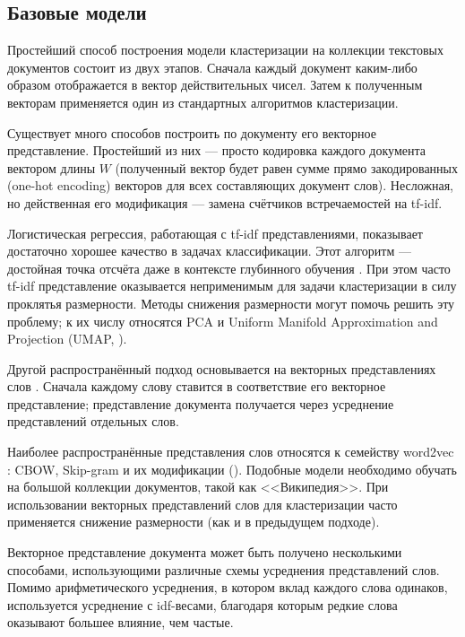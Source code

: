 \subsection{Базовые модели}

\par Простейший способ построения модели кластеризации на коллекции текстовых документов состоит из двух этапов. Сначала каждый документ каким-либо образом отображается в вектор действительных чисел. Затем к полученным векторам применяется один из стандартных алгоритмов кластеризации.


\par Существует много способов построить по документу его векторное представление. Простейший из них --- просто кодировка каждого документа вектором длины $W$ (полученный вектор будет равен сумме прямо закодированных (one-hot encoding) векторов для всех составляющих документ слов). Несложная, но действенная его модификация --- замена счётчиков встречаемостей на tf-idf.

Логистическая регрессия, работающая с tf-idf представлениями, показывает достаточно хорошее качество в задачах классификации. Этот алгоритм --- достойная точка отсчёта даже в контексте глубинного обучения \cite{park2019adc}. При этом часто tf-idf представление оказывается неприменимым для задачи кластеризации в силу проклятья размерности. Методы снижения размерности могут помочь решить эту проблему; к их числу относятся PCA и Uniform Manifold Approximation and Projection (UMAP, \cite{mcinnes2018umap}).

\par Другой распространённый подход основывается на векторных представлениях слов \cite{embeddings_in_tm}. Сначала каждому слову ставится в соответствие его векторное представление; представление документа получается через усреднение представлений отдельных слов.

Наиболее распространённые представления слов относятся к семейству word2vec \cite{word2vec}: CBOW, Skip-gram и их модификации (\cite{mikolov2013efficient}).  Подобные модели необходимо обучать на большой коллекции документов, такой как <<Википедия>>. При использовании векторных представлений слов для кластеризации часто применяется снижение размерности \cite{park2019adc} (как и в предыдущем подходе).

Векторное представление документа может быть получено несколькими способами, использующими различные схемы усреднения представлений слов. Помимо арифметического усреднения, в котором вклад каждого слова одинаков, используется усреднение с idf-весами, благодаря которым редкие слова оказывают большее влияние, чем частые.


